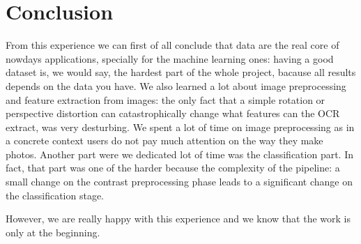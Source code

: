 \documentclass[10pt,twocolumn,letterpaper]{article}
\begin{document}
\section{Conclusion}
\label{sec:conclusion}

From this experience we can first of all conclude that data are the
real core of nowdays applications, specially for the machine learning
ones: having a good dataset is, we would say, the hardest part of the
whole project, bacause all results depends on the data you have. We
also learned a lot about image preprocessing and feature extraction
from images: the only fact that a simple rotation or perspective
distortion can catastrophically change what features can the OCR
extract, was very desturbing. We spent a lot of time on image
preprocessing as in a concrete context users do not pay much attention
on the way they make photos. Another part were we dedicated lot of
time was the classification part. In fact, that part was one of the
harder because the complexity of the pipeline: a small change on the
contrast preprocessing phase leads to a significant change on the
classification stage. 

However, we are really happy with this experience and we know that the
work is only at the beginning.

{\small


}
\end{document}
